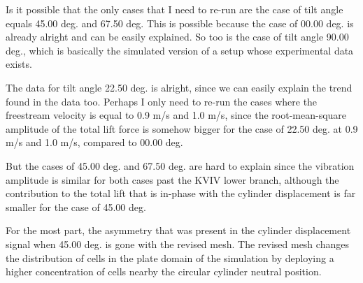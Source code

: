 Is it possible that the only cases that I need to re-run are the case of tilt angle equals 45.00 deg. and 67.50 deg. This is possible because the case of 00.00 deg. is already alright and can be easily explained. So too is the case of tilt angle 90.00 deg., which is basically the simulated version of a setup whose experimental data exists.

The data for tilt angle 22.50 deg. is alright, since we can easily explain the trend found in the data too. Perhaps I only need to re-run the cases where the freestream velocity is equal to 0.9 m/s and 1.0 m/s, since the root-mean-square amplitude of the total lift force is somehow bigger for the case of 22.50 deg. at 0.9 m/s and 1.0 m/s, compared to 00.00 deg.

But the cases of 45.00 deg. and 67.50 deg. are hard to explain since the vibration amplitude is similar for both cases past the KVIV lower branch, although the contribution to the total lift that is in-phase with the cylinder displacement is far smaller for the case of 45.00 deg.

For the most part, the asymmetry that was present in the cylinder displacement signal when 45.00 deg. is gone with the revised mesh. The revised mesh changes the distribution of cells in the plate domain of the simulation by deploying a higher concentration of cells nearby the circular cylinder neutral position.
